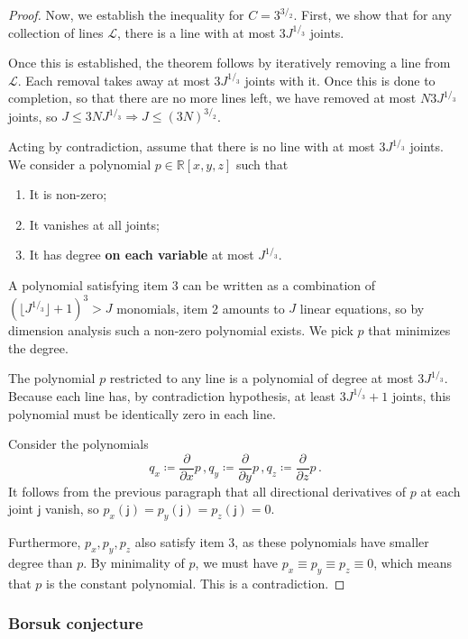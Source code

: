 \documentclass[12pt]{amsart}
\theoremstyle{definition}
\newcommand{\R}{\mathbb{R}}
\newcommand{\vj}{\mathsf{j}}
\begin{document}
\begin{proof}
Now, we establish the inequality for $C = 3^{3/_2}$.
First, we show that for any collection of lines $\mathcal L$, there is a line with at most $3 J^{1/_3}$ joints.

Once this is established, the theorem follows by iteratively removing a line from $\mathcal L$.
Each removal takes away at most $3 J^{1/_3}$ joints with it.
Once this is done to completion, so that there are no more lines left, we have removed at most $N 3 J^{1/_3}$ joints, so $J \leq 3 N J^{1/_3} \Rightarrow J \leq (3N)^{3/_2}$.


Acting by contradiction, assume that there is no line with at most $3 J^{1/_3}$ joints. 
We consider a polynomial $p \in \R[x, y, z]$ such that 
\begin{enumerate}
\item It is non-zero;

\item It vanishes at all joints;

\item It has degree \textbf{on each variable} at most $J^{1/_3}$.
\end{enumerate}

A polynomial satisfying item 3 can be written as a combination of $(\lfloor J^{1/_3}\rfloor + 1)^3 > J$ monomials, item 2 amounts to $J$ linear equations, so by dimension analysis such a non-zero polynomial exists.
We pick $p$ that minimizes the degree.

The polynomial $p$ restricted to any line is a polynomial of degree at most $3J^{1/_3}$.
Because each line has, by contradiction hypothesis, at least $3 J^{1/_3} + 1$ joints, this polynomial must be identically zero in each line.

Consider the polynomials
$$q_x \coloneqq \frac{\partial}{\partial x} p \, , q_y \coloneqq \frac{\partial}{\partial y} p \, , q_z \coloneqq \frac{\partial}{\partial z} p \, .$$
It follows from the previous paragraph that all directional derivatives of $p$ at each joint $\vj$ vanish, so $p_x(\vj) = p_y(\vj) = p_z(\vj) = 0$.

Furthermore, $p_x, p_y, p_z$ also satisfy item 3, as these polynomials have smaller degree than $p$.
By minimality of $p$, we must have $p_x \equiv p_y \equiv p_z  \equiv 0$, which means that $p$ is the constant polynomial.
This is a contradiction.
\end{proof}

\subsubsection*{Borsuk conjecture}
\end{document}
